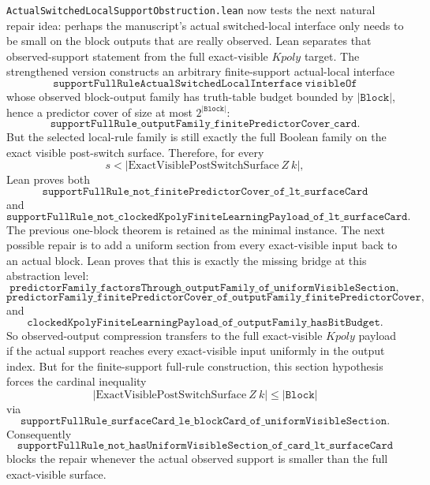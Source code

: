 \documentclass[11pt]{article}
\theoremstyle{remark}
\begin{document}
\texttt{ActualSwitchedLocalSupportObstruction.lean} now tests the next natural
repair idea: perhaps the manuscript's actual switched-local interface only
needs to be small on the block outputs that are really observed.  Lean separates
that observed-support statement from the full exact-visible \(Kpoly\) target.
The strengthened version constructs an arbitrary finite-support actual-local
interface
\[
  \texttt{supportFullRuleActualSwitchedLocalInterface}\ \texttt{visibleOf}
\]
whose observed block-output family has truth-table budget bounded by
\(|\texttt{Block}|\), hence a predictor cover of size at most
\(2^{|\texttt{Block}|}\):
\[
  \texttt{supportFullRule\_outputFamily\_finitePredictorCover\_card}.
\]
But the selected local-rule family is still exactly the full Boolean family on
the exact visible post-switch surface.  Therefore, for every
\[
  s < |\text{ExactVisiblePostSwitchSurface}\ Z\ k|,
\]
Lean proves both
\[
  \texttt{supportFullRule\_not\_finitePredictorCover\_of\_lt\_surfaceCard}
\]
and
\[
  \texttt{supportFullRule\_not\_clockedKpolyFiniteLearningPayload\_of\_lt\_surfaceCard}.
\]
The previous one-block theorem is retained as the minimal instance.
The next possible repair is to add a uniform section from every exact-visible
input back to an actual block.  Lean proves that this is exactly the missing
bridge at this abstraction level:
\[
  \texttt{predictorFamily\_factorsThrough\_outputFamily\_of\_uniformVisibleSection},
\]
\[
  \texttt{predictorFamily\_finitePredictorCover\_of\_outputFamily\_finitePredictorCover},
\]
and
\[
  \texttt{clockedKpolyFiniteLearningPayload\_of\_outputFamily\_hasBitBudget}.
\]
So observed-output compression transfers to the full exact-visible \(Kpoly\)
payload if the actual support reaches every exact-visible input uniformly in
the output index.  But for the finite-support full-rule construction, this
section hypothesis forces the cardinal inequality
\[
  |\text{ExactVisiblePostSwitchSurface}\ Z\ k| \le |\texttt{Block}|
\]
via
\[
  \texttt{supportFullRule\_surfaceCard\_le\_blockCard\_of\_uniformVisibleSection}.
\]
Consequently
\[
  \texttt{supportFullRule\_not\_hasUniformVisibleSection\_of\_card\_lt\_surfaceCard}
\]
blocks the repair whenever the actual observed support is smaller than the
full exact-visible surface.
\end{document}
